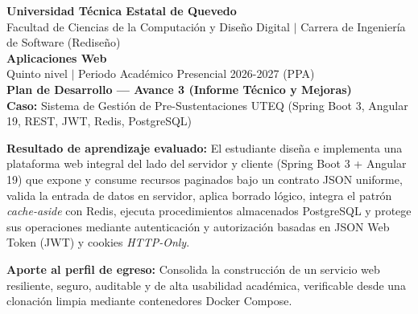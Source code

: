 \documentclass[10pt,a4paper]{article}
\begin{document}
\begin{tcolorbox}[colframe=uteqgreen,colback=white,arc=1mm,boxrule=1.2pt,halign=center]
{\Large \bfseries Universidad Técnica Estatal de Quevedo}\\[2pt]
{\small Facultad de Ciencias de la Computación y Diseño Digital $|$ Carrera de Ingeniería de Software (Rediseño)}\\[4pt]
{\large \bfseries Aplicaciones Web}\\[2pt]
{\small Quinto nivel $|$ Periodo Académico Presencial 2026-2027 (PPA)}\\[4pt]
{\Large \bfseries Plan de Desarrollo --- Avance 3 (Informe Técnico y Mejoras)}\\[2pt]
{\small \bfseries Caso:} Sistema de Gestión de Pre-Sustentaciones UTEQ (Spring Boot 3, Angular 19, REST, JWT, Redis, PostgreSQL)
\end{tcolorbox}

\vspace{0.3cm}

\noindent \textbf{Resultado de aprendizaje evaluado:} El estudiante diseña e implementa una plataforma web integral del lado del servidor y cliente (Spring Boot 3 + Angular 19) que expone y consume recursos paginados bajo un contrato JSON uniforme, valida la entrada de datos en servidor, aplica borrado lógico, integra el patrón \textit{cache-aside} con Redis, ejecuta procedimientos almacenados PostgreSQL y protege sus operaciones mediante autenticación y autorización basadas en JSON Web Token (JWT) y cookies \textit{HTTP-Only}.

\vspace{0.2cm}
\noindent \textbf{Aporte al perfil de egreso:} Consolida la construcción de un servicio web resiliente, seguro, auditable y de alta usabilidad académica, verificable desde una clonación limpia mediante contenedores Docker Compose.

\vspace{0.4cm}
\end{document}
